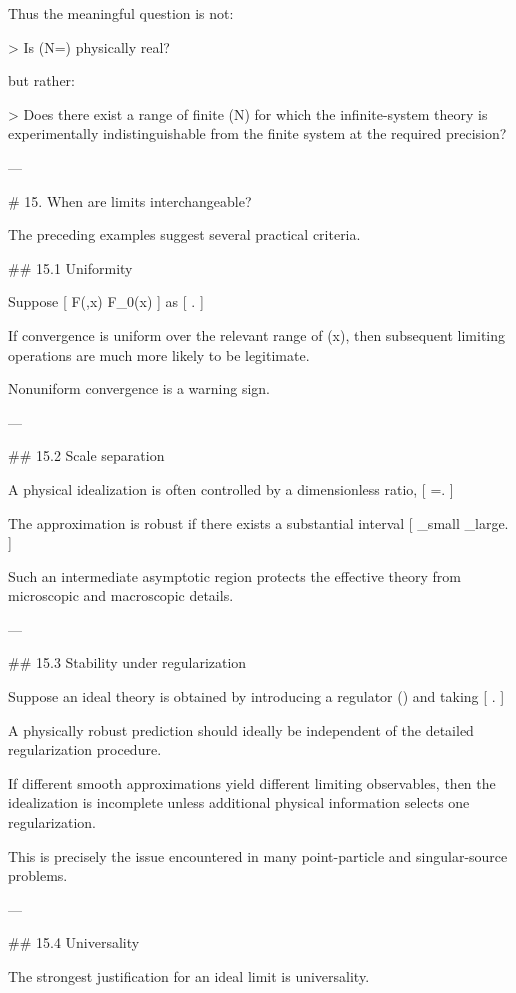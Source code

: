 Thus the meaningful question is not:

> Is (N=\infty) physically real?

but rather:

> Does there exist a range of finite (N) for which the infinite-system theory is experimentally indistinguishable from the finite system at the required precision?

---

# 15. When are limits interchangeable?

The preceding examples suggest several practical criteria.

## 15.1 Uniformity

Suppose
[
F(\epsilon,x)
\rightarrow
F_0(x)
]
as
[
\epsilon{}.
]

If convergence is uniform over the relevant range of (x), then subsequent limiting operations are much more likely to be legitimate.

Nonuniform convergence is a warning sign.

---

## 15.2 Scale separation

A physical idealization is often controlled by a dimensionless ratio,
[
\epsilon=.
]

The approximation is robust if there exists a substantial interval
[
\ell_{\rm small}
\ll
\ell
\ll
\ell_{\rm large}.
]

Such an intermediate asymptotic region protects the effective theory from microscopic and macroscopic details.

---

## 15.3 Stability under regularization

Suppose an ideal theory is obtained by introducing a regulator (\epsilon) and taking
[
\epsilon{}.
]

A physically robust prediction should ideally be independent of the detailed regularization procedure.

If different smooth approximations yield different limiting observables, then the idealization is incomplete unless additional physical information selects one regularization.

This is precisely the issue encountered in many point-particle and singular-source problems.

---

## 15.4 Universality

The strongest justification for an ideal limit is universality.


